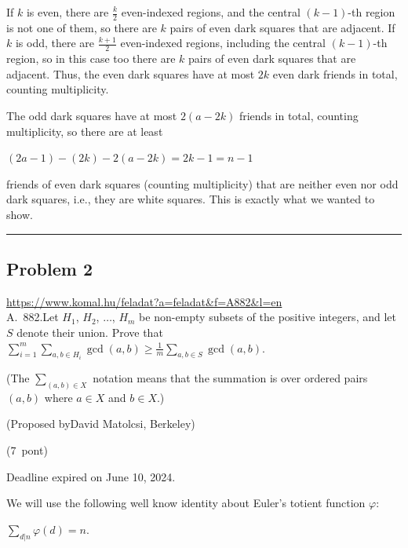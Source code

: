 \documentclass{article}
\begin{document}
If \(\displaystyle k\) is even, there are \(\displaystyle \frac{k}{2}\) even-indexed regions, and the central \(\displaystyle (k-1)\)-th region is not one of them, so there are \(\displaystyle k\) pairs of even dark squares that are adjacent. If \(\displaystyle k\) is odd, there are \(\displaystyle \frac{k+1}{2}\) even-indexed regions, including the central \(\displaystyle (k-1)\)-th region, so in this case too there are \(\displaystyle k\) pairs of even dark squares that are adjacent. Thus, the even dark squares have at most \(\displaystyle 2k\) even dark friends in total, counting multiplicity.

The odd dark squares have at most \(\displaystyle 2(a-2k)\) friends in total, counting multiplicity, so there are at least

\(\displaystyle (2a-1)-(2k)-2(a-2k)=2k-1=n-1\)

friends of even dark squares (counting multiplicity) that are neither even nor odd dark squares, i.e., they are white squares. This is exactly what we wanted to show.

\vspace{1em}
\hrule
\vspace{1em}

\subsection*{Problem 2}
\noindent\url{https://www.komal.hu/feladat?a=feladat&f=A882&l=en}\\[1em]

A. 882.Let \(\displaystyle H_1\), \(\displaystyle H_2\), \(\displaystyle \ldots\), \(\displaystyle H_m\) be non-empty subsets of the positive integers, and let \(\displaystyle S\) denote their union. Prove that \(\displaystyle \sum_{i=1}^m \sum_{a, b\in H_i} \gcd(a,b) \ge \frac{1}{m} \sum_{a, b\in S} \gcd(a, b)\).

(The \(\displaystyle \sum_{(a,b)\in X}\) notation means that the summation is over ordered pairs \(\displaystyle (a,b)\) where \(\displaystyle a\in X\) and \(\displaystyle b\in X\).)

(Proposed byDavid Matolcsi, Berkeley)

(7 pont)

Deadline expired on June 10, 2024.

We will use the following well know identity about Euler's totient function \(\displaystyle \varphi\):

\(\displaystyle \sum_{d|n} \varphi(d)=n.\)
\end{document}
